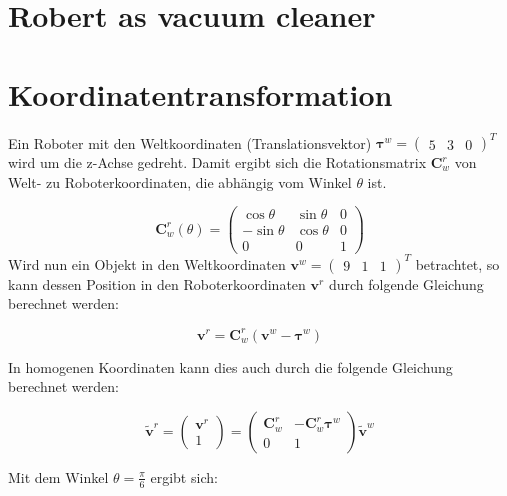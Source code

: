 \documentclass[12pt,a4paper]{report}
\begin{document}
\chapter{Robert as vacuum cleaner}

\chapter{Koordinatentransformation}
Ein Roboter mit den Weltkoordinaten (Translationsvektor) \(\boldsymbol{\tau}^w = \begin{pmatrix} 5 & 3 & 0 \end{pmatrix}^{T}\)
wird um die z-Achse gedreht. Damit ergibt sich die Rotationsmatrix \(\mathbf{C}^r_w\) von Welt- zu Roboterkoordinaten, die
abhängig vom Winkel \(\theta\) ist.


\[
    \mathbf{C}^r_w(\theta) =
    \begin{pmatrix}
        \cos\theta  & \sin\theta & 0 \\
        -\sin\theta & \cos\theta & 0 \\
        0           & 0          & 1
    \end{pmatrix}
\]
Wird nun ein Objekt in den Weltkoordinaten \(\mathbf{v}^w = \begin{pmatrix} 9 & 1 & 1 \end{pmatrix}^{T}\) betrachtet,
so kann dessen Position in den Roboterkoordinaten \(\mathbf{v}^r\) durch folgende Gleichung berechnet werden:

\[
    \mathbf{v}^r = \mathbf{C}^r_w(\mathbf{v}^w - \boldsymbol{\tau}^w)
\]

In homogenen Koordinaten kann dies auch durch die folgende Gleichung berechnet werden:

\[
    \tilde{\mathbf{v}}^r =
    \begin{pmatrix}
        \mathbf{v}^r \\
        1
    \end{pmatrix}
    =
    \begin{pmatrix}
        \mathbf{C}^r_w & -\mathbf{C}^r_w\boldsymbol{\tau}^w \\
        0              & 1
    \end{pmatrix}
    \tilde{\mathbf{v}}^w
\]

Mit dem Winkel \(\theta = \frac{\pi}{6}\) ergibt sich:
\end{document}
